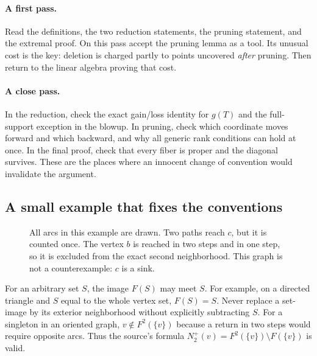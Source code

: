\paragraph{A first pass.}
Read the definitions, the two reduction statements, the pruning statement,
and the extremal proof. On this pass accept the pruning lemma as a tool.
Its unusual cost is the key: deletion is charged partly to points uncovered
\emph{after} pruning. Then return to the linear algebra proving that cost.

\paragraph{A close pass.}
In the reduction, check the exact gain/loss identity for $g(T)$ and the
full-support exception in the blowup. In pruning, check which coordinate
moves forward and which backward, and why all generic rank conditions can
hold at once. In the final proof, check that every fiber is proper and the
diagonal survives. These are the places where an innocent change of
convention would invalidate the argument.

\subsection*{A small example that fixes the conventions}
\begin{figure}[ht]
\centering
{}
\caption{All arcs in this example are drawn. Two paths reach $c$, but it is counted once. The vertex $b$ is reached in two steps and in one step, so it is excluded from the exact second neighborhood. This graph is not a counterexample: $c$ is a sink.}
\end{figure}
For an arbitrary set $S$, the image $F(S)$ may meet $S$. For example,
on a directed triangle and $S$ equal to the whole vertex set, $F(S)=S$.
Never replace a set-image by its exterior neighborhood without explicitly
subtracting $S$. For a singleton in an oriented graph, $v\notin F^2(\{v\})$
because a return in two steps would require opposite arcs. Thus the source's
formula $N_2^+(v)=F^2(\{v\})\setminus F(\{v\})$ is valid.

